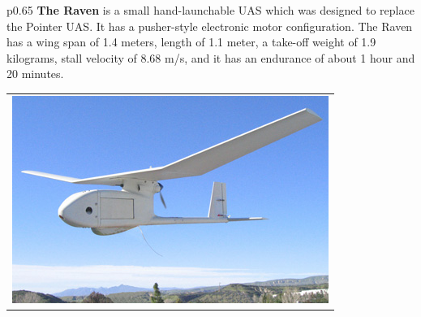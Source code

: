 \documentclass[]{article}
\begin{document}
\begin{table}[H]
\begin{minipage}[b]{0.65\linewidth}
\begin{tabular}{*{1}{p{0.65\textwidth}}}
{\bf The Raven} is a small hand-launchable UAS which was designed to replace the Pointer UAS.  It has a pusher-style electronic motor configuration.  The Raven has a wing span of 1.4 meters, length of 1.1 meter, a take-off weight of 1.9 kilograms, stall velocity of 8.68 m/s, and it has an endurance of about 1 hour and 20 minutes.
\end{tabular}
\end{minipage}
\hfill
\begin{minipage}[b]{0.5\linewidth}
\begin{tabular}{*{1}{p{}}}
\includegraphics[height=8\baselineskip]{theraven}
\end{tabular}
\end{minipage}
\end{table}
\end{document}
